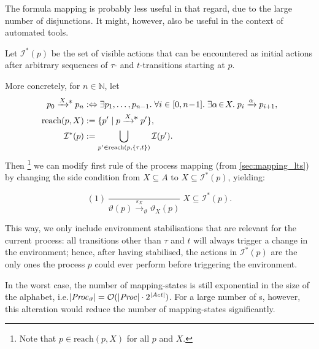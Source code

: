 \begin{isabellebody}
\begin{isamarkuptext}
The formula mapping is probably less useful in that regard, due to the large number of disjunctions. It might, however, also be useful in the context of automated tools.%
\end{isamarkuptext}\isamarkuptrue%
%
\isadelimdocument
%
\endisadelimdocument
%
\isatagdocument
%
\isamarkuptrue%
%
\endisatagdocument
{\isafolddocument}%
%
\isadelimdocument
%
\endisadelimdocument
%
\begin{isamarkuptext}%
Let $\mathcal{I}^*(p)$ be the set of visible actions that can be encountered as initial actions after arbitrary sequences of $\tau$- and $t$-transitions starting at $p$.

More concretely, for $n \in \mathbb{N}$, let 
\begin{align*}
    p_0 \xrightarrow{X}\!\!\raisebox{1pt}{*}\; p_n &:\Leftrightarrow \exists p_1,\dots,p_{n-1} .\;
    \forall i \in [0,n\!-\!1] .\; \exists \alpha\!\in\!X .\; p_i \xrightarrow{\alpha} p_{i+1}, \\
    \text{reach}(p,X) &:= \{ p' \mid p \xrightarrow{X}\!\!\raisebox{1pt}{*}\; p' \}, \\
    \mathcal{I}^*(p) &:= \bigcup_{p' \in \text{reach}(p,\{\tau,t\})} \mathcal{I}(p').
\end{align*}
Then%
\footnote{Note that $p \in \text{reach}(p,X)$ for all $p$ and $X$.}
we can modify first rule of the process mapping (from \cref{sec:mapping_lts}) by changing the side condition from $X \subseteq A$ to $X \subseteq \mathcal{I}^*(p)$, yielding:

$$
(1)\,\frac{}{\vartheta(p) \xrightarrow{\varepsilon_X}_\vartheta \vartheta_X(p)} \; X \subseteq \mathcal{I}^*(p).
$$

This way, we only include environment stabilisations that are relevant for the current process: all transitions other than $\tau$ and $t$ will always trigger a change in the environment; hence, after having stabilised, the actions in $\mathcal{I}^*(p)$ are the only ones the process $p$ could ever perform before triggering the environment.

In the worst case, the number of mapping-states is still exponential in the size of the alphabet, i.e.\@ $|\mathit{Proc}_\vartheta| = \mathcal{O}(|\mathit{Proc}| \cdot 2^{|\mathit{Act}|})$. For a large number of \LTSt{}s, however, this alteration would reduce the number of mapping-states significantly.


\end{isamarkuptext}
\end{isabellebody}
